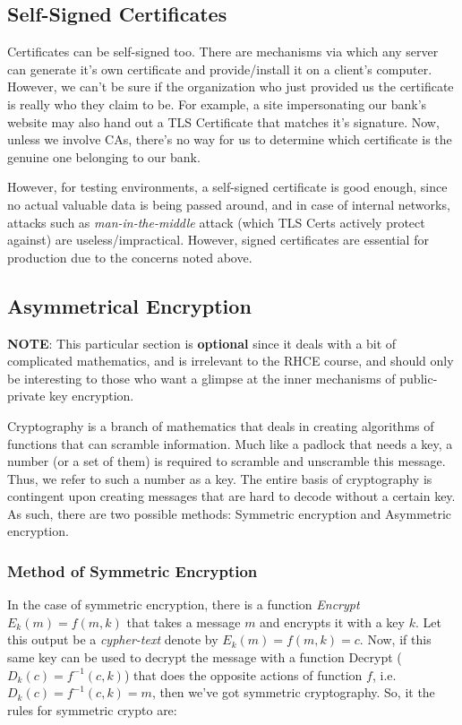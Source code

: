 \subsection{Self-Signed Certificates}
Certificates can be self-signed too. There are mechanisms via which any server can generate it's own certificate and provide/install it on a client's computer. However, we can't be sure if the organization who just provided us the certificate is really who they claim to be. For example, a site impersonating our bank's website may also hand out a TLS Certificate that matches it's signature. Now, unless we involve CAs, there's no way for us to determine which certificate is the genuine one belonging to our bank. 

However, for testing environments, a self-signed certificate is good enough, since no actual valuable data is being passed around, and in case of internal networks, attacks such as \textit{man-in-the-middle} attack (which TLS Certs actively protect against) are useless/impractical. However, signed certificates are essential for production due to the concerns noted above. 

\subsection{Asymmetrical Encryption}
\textbf{NOTE}: This particular section is \textbf{optional} since it deals with a bit of complicated mathematics, and is irrelevant to the RHCE course, and should only be interesting to those who want a glimpse at the inner mechanisms of public-private key encryption. 

Cryptography is a branch of mathematics that deals in creating algorithms of functions that can scramble information. Much like a padlock that needs a key, a number (or a set of them) is required to scramble and unscramble this message. Thus, we refer to such a number as a key. The entire basis of cryptography is contingent upon creating messages that are hard to decode without a certain key. As such, there are two possible methods: Symmetric encryption and Asymmetric encryption. 

\subsubsection{Method of Symmetric Encryption}
\vspace{-10pt}
In the case of symmetric encryption, there is a function \textit{Encrypt} $E_k(m)=f(m,k)$ that takes a message $m$ and encrypts it with a key $k$. Let this output be a \textit{cypher-text} denote by $E_k(m)=f(m,k)=c$. Now, if this same key can be used to decrypt the message with a function Decrypt ($D_k(c)=f^{-1}(c,k)$) that does the opposite actions of function $f$, i.e. $D_k(c)=f^{-1}(c,k)=m$,  then we've got symmetric cryptography. So, it the rules for symmetric crypto are: 

